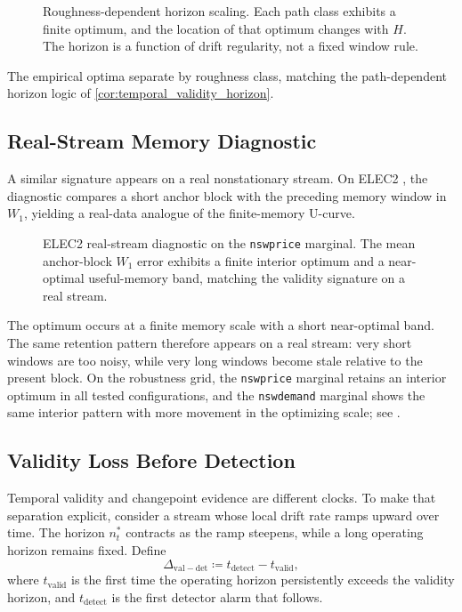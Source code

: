 \begin{figure}[!htbp]
\centering
{}
\caption{Roughness-dependent horizon scaling. Each path class exhibits a finite
optimum, and the location of that optimum changes with $H$. The horizon is a
function of drift regularity, not a fixed window rule.}
\label{fig:roughness_family}
\end{figure}

The empirical optima separate by roughness class, matching the path-dependent
horizon logic of \cref{cor:temporal_validity_horizon}.

\subsection{Real-Stream Memory Diagnostic}

A similar signature appears on a real nonstationary stream. On ELEC2
\citep{Harries1999ELEC2}, the diagnostic compares a short anchor block with the
preceding memory window in $W_1$, yielding a real-data analogue of the
finite-memory U-curve.

\begin{figure}[!htbp]
\centering
{}
\caption{ELEC2 real-stream diagnostic on the \texttt{nswprice} marginal. The
mean anchor-block $W_1$ error exhibits a finite interior optimum and a
near-optimal useful-memory band, matching the validity signature on a real
stream.}
\label{fig:elec2_ucurve}
\end{figure}

The optimum occurs at a finite memory scale with a short near-optimal band. The
same retention pattern therefore appears on a real stream: very short windows
are too noisy, while very long windows become stale relative to the present
block. On the robustness grid, the \texttt{nswprice} marginal retains an
interior optimum in all tested configurations, and the \texttt{nswdemand}
marginal shows the same interior pattern with more movement in the optimizing
scale; see .

\subsection{Validity Loss Before Detection}\label{sec:empirical_validity_lag}

Temporal validity and changepoint evidence are different clocks. To make that
separation explicit, consider a stream whose local drift rate ramps upward over
time. The horizon $n_t^*$ contracts as the ramp steepens, while a long
operating horizon remains fixed. Define
\[
  \Delta_{\mathrm{val-det}} \coloneqq t_{\mathrm{detect}} - t_{\mathrm{valid}},
\]
where $t_{\mathrm{valid}}$ is the first time the operating horizon persistently
exceeds the validity horizon, and $t_{\mathrm{detect}}$ is the first
detector alarm that follows.

